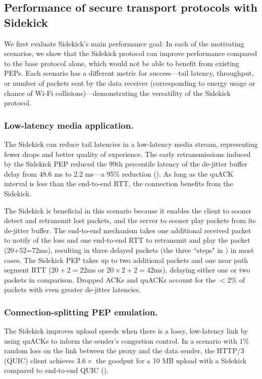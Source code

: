 \subsection{Performance of secure transport protocols with Sidekick}
\label{sec:sidekick:emulation:performance}

We first evaluate Sidekick's main performance goal: In each of the motivating
scenarios, we show that the Sidekick protocol can improve performance compared
to the base protocol alone, which would not be able to benefit from existing
PEPs. Each scenario has a different metric for success---tail latency,
throughput, or number of packets sent by the data receiver (corresponding to
energy usage or chance of Wi-Fi collisions)---demonstrating the versatility of
the Sidekick protocol.

\subsubsection{Low-latency media application.}

The Sidekick can reduce tail latencies in a low-latency media stream,
representing fewer drops and better quality of experience. The early
retransmissions induced by the Sidekick PEP reduced the 99th percentile latency of
the de-jitter buffer delay from 48.6 ms to 2.2 ms---a 95\% reduction
(). As long as the quACK interval is less
than the end-to-end RTT, the connection benefits from the Sidekick.

The Sidekick is beneficial in this scenario because it enables the client to
sooner detect and retransmit lost packets, and the server to sooner play
packets from its de-jitter buffer. The end-to-end mechanism takes one
additional received packet to notify of the loss and one end-to-end RTT to
retransmit and play the packet (20+52=72ms), resulting in three delayed
packets (the three ``steps" in ) in most
cases. The Sidekick PEP takes up to two additional packets and one near path
segment RTT ($20+2=22$ms or $20\times2+2=42$ms), delaying either one or two
packets in comparison. Dropped ACKs and quACKs account for the $<2\%$ of
packets with even greater de-jitter latencies.

\subsubsection{Connection-splitting PEP emulation.}

The Sidekick improves upload speeds when there is a lossy, low-latency link
by using quACKs to inform the sender's congestion control.
In a scenario with $1\%$ random loss on the link between the proxy and the
data sender, the HTTP/3 (QUIC) client achieves $3.6\times$ the goodput for a
10 MB upload with a Sidekick compared to end-to-end QUIC
().

